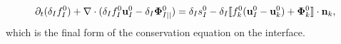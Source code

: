 \begin{equation}
    \partial_t (\delta_If_I^0)  
    + \mathbf{\nabla}\cdot (
        \delta_I f_I^0 \textbf{u}_I^0
        - \delta_I \mathbf{\Phi}_{I||}^0 
        )
    = 
    \delta_Is_I^0
    - \delta_I\llbracket 
    f_k^0 (\textbf{u}_I^0 - \textbf{u}_k^0)
    + \mathbf{\Phi}_k^0 \rrbracket \cdot \textbf{n}_k,
\end{equation}
which is the final form of the conservation equation on the interface.


